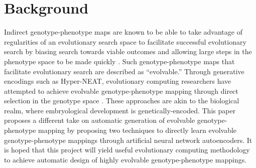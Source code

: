 \section{Background} \label{sec:background}

Indirect genotype-phenotype maps are known to be able to take advantage of regularities of an evolutionary search space to facilitate successful evolutionary search by biasing search towards viable outcomes and allowing large steps in the phenotype space to be made quickly \cite{clune2009evolving}.
Such genotype-phenotype maps that facilitate evolutionary search are described as ``evolvable.''
Through generative encodings such as Hyper-NEAT, evolutionary computing researchers have attempted to achieve evolvable genotype-phenotype mapping through direct selection in the genotype space \cite{mengistu2016evolvability}.
These approaches are akin to the biological realm, where embryological development is genetically-encoded.
This paper proposes a different take on automatic generation of evolvable genotype-phenotype mapping by proposing two techniques to directly learn evolvable genotype-phenotype mappings through artificial neural network autoencoders.
It is hoped that this project will yield useful evolutionary computing methodology to achieve automatic design of highly evolvable genotype-phenotype mappings.
